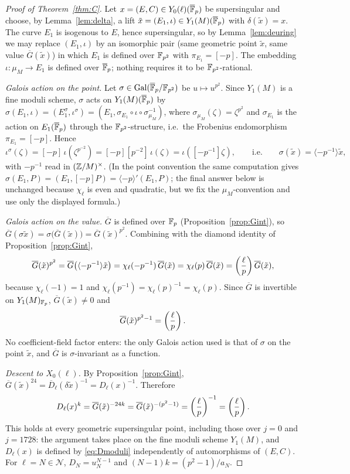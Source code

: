 \begin{proof}[Proof of Theorem~\ref{thm:C}]
Let $x=(E,C)\in Y_0(\ell)(\overline{\mathbb F}_p)$ be supersingular and choose, by Lemma~\ref{lem:delta}, a lift
$\tilde x=(E_1,\iota)\in Y_1(M)(\overline{\mathbb F}_p)$ with $\delta(\tilde x)=x$. The curve $E_1$ is isogenous to $E$,
hence supersingular, so by Lemma~\ref{lem:deuring} we may replace $(E_1,\iota)$ by an isomorphic
pair (same geometric point $\tilde x$, same value $\overline G(\tilde x)$) in which $E_1$ is defined
over $\mathbb F_{p^2}$ with $\pi_{E_1}=[-p]$. The embedding $\iota:\mu_M\to E_1$ is defined over $\overline{\mathbb F}_p$; nothing
requires it to be $\mathbb F_{p^2}$-rational.

\emph{Galois action on the point.} Let $\sigma\in\operatorname{Gal}(\overline{\mathbb F}_p/\mathbb F_{p^2})$ be $u\mapsto u^{p^2}$.
Since $Y_1(M)$ is a fine moduli scheme, $\sigma$ acts on $Y_1(M)(\overline{\mathbb F}_p)$ by
$\sigma(E_1,\iota)=(E_1^\sigma,\iota^\sigma)=(E_1,\sigma_{E_1}\circ\iota\circ\sigma_{\mu_M}^{-1})$,
where $\sigma_{\mu_M}(\zeta)=\zeta^{p^2}$ and $\sigma_{E_1}$ is the action on $E_1(\overline{\mathbb F}_p)$ through the
$\mathbb F_{p^2}$-structure, i.e.\ the Frobenius endomorphism $\pi_{E_1}=[-p]$. Hence
\[
\iota^\sigma(\zeta)=[-p]\,\iota(\zeta^{p^{-2}})=[-p][p^{-2}]\,\iota(\zeta)=\iota([-p^{-1}]\zeta),
\qquad\text{i.e.}\qquad \sigma(\tilde x)=\langle -p^{-1}\rangle\tilde x,
\]
with $-p^{-1}$ read in $(\mathbb Z/M)^\times$. (In the point convention the same computation gives
$\sigma(E_1,P)=(E_1,[-p]P)=\langle-p\rangle'(E_1,P)$; the final answer below is unchanged because
$\chi_\ell$ is even and quadratic, but we fix the $\mu_M$-convention and use only the displayed formula.)

\emph{Galois action on the value.} $\overline G$ is defined over $\mathbb F_p$
(Proposition~\ref{prop:Gint}), so $\overline G(\sigma\tilde x)=\sigma\bigl(\overline G(\tilde x)\bigr)
=\overline G(\tilde x)^{p^2}$. Combining with the diamond identity of Proposition~\ref{prop:Gint},
\[
\overline G(\tilde x)^{p^2}=\overline G\bigl(\langle-p^{-1}\rangle\tilde x\bigr)
=\chi_\ell(-p^{-1})\,\overline G(\tilde x)=\chi_\ell(p)\,\overline G(\tilde x)=\left(\frac{\ell}{p}\right)\overline G(\tilde x),
\]
because $\chi_\ell(-1)=1$ and $\chi_\ell(p^{-1})=\chi_\ell(p)^{-1}=\chi_\ell(p)$. Since
$\overline G$ is invertible on $Y_1(M)_{\mathbb F_p}$, $\overline G(\tilde x)\ne0$ and
\begin{equation}\label{eq:Gfrob}
\overline G(\tilde x)^{p^2-1}=\left(\frac{\ell}{p}\right).
\end{equation}
No coefficient-field factor enters: the only Galois action used is that of $\sigma$ on the point
$\tilde x$, and $\overline G$ is $\sigma$-invariant as a function.

\emph{Descent to $X_0(\ell)$.} By Proposition~\ref{prop:Gint},
$\overline G(\tilde x)^{24}=\overline D_\ell(\delta\tilde x)^{-1}=D_\ell(x)^{-1}$. Therefore
\[
D_\ell(x)^{k}=\overline G(\tilde x)^{-24k}=\overline G(\tilde x)^{-(p^2-1)}=\left(\frac{\ell}{p}\right)^{-1}=\left(\frac{\ell}{p}\right).
\]
This holds at every geometric supersingular point, including those over $j=0$ and $j=1728$: the
argument takes place on the fine moduli scheme $Y_1(M)$, and $D_\ell(x)$ is defined by
\eqref{eq:Dmoduli} independently of automorphisms of $(E,C)$. For $\ell=N\in\mathcal N$,
$D_N=u_N^{N-1}$ and $(N-1)k=(p^2-1)/a_N$.
\end{proof}

